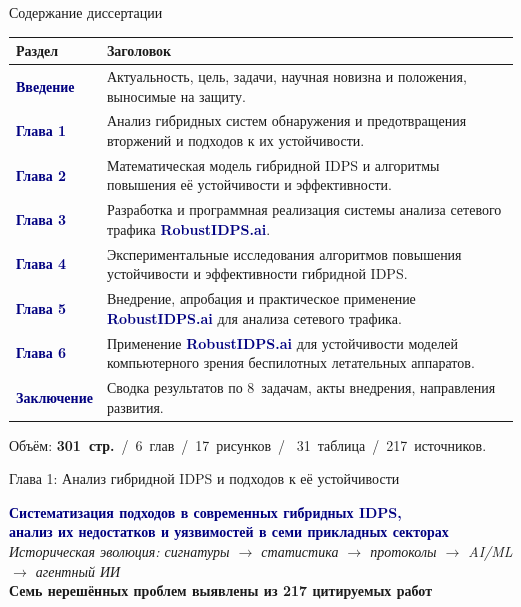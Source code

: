 \documentclass[10pt,aspectratio=169]{beamer}
\newcommand{\hl}[1]{\textcolor{accent}{\textbf{#1}}}
\newcommand{\bn}[1]{\textcolor{navy}{\textbf{#1}}}
\begin{document}
\begin{frame}{Содержание диссертации}
\scriptsize
\begin{tabular}{@{}p{1.8cm}p{12.4cm}@{}}
\toprule
\textbf{Раздел} & \textbf{Заголовок} \\
\midrule
\bn{Введение} & Актуальность, цель, задачи, научная новизна и
положения, выносимые на защиту. \\
\midrule
\bn{Глава 1} & Анализ гибридных систем обнаружения и
предотвращения вторжений и подходов к их устойчивости. \\
\midrule
\bn{Глава 2} & Математическая модель гибридной IDPS и алгоритмы
повышения её устойчивости и эффективности. \\
\midrule
\bn{Глава 3} & Разработка и программная реализация системы
анализа сетевого трафика \bn{RobustIDPS.ai}. \\
\midrule
\bn{Глава 4} & Экспериментальные исследования алгоритмов
повышения устойчивости и эффективности гибридной IDPS. \\
\midrule
\bn{Глава 5} & Внедрение, апробация и практическое применение
\bn{RobustIDPS.ai} для анализа сетевого трафика. \\
\midrule
\bn{Глава 6} & Применение \bn{RobustIDPS.ai} для устойчивости
моделей компьютерного зрения беспилотных летательных
аппаратов. \\
\midrule
\bn{Заключение} & Сводка результатов по 8~задачам, акты
внедрения, направления развития. \\
\bottomrule
\end{tabular}
\smallskip
\begin{block}{}
\scriptsize Объём: \hl{301~стр.}~/~6~глав~/~17~рисунков~/~
31~таблица~/~217~источников.
\end{block}
\end{frame}

\begin{frame}{Глава 1: Анализ гибридной IDPS и подходов к её устойчивости}
\vspace{1.5cm}
\begin{center}
{\Large\bn{Систематизация подходов в современных
гибридных IDPS,\\
анализ их недостатков и уязвимостей в семи прикладных
секторах}}\\[1cm]

\textit{Историческая эволюция: сигнатуры $\to$ статистика
$\to$ протоколы $\to$ AI/ML $\to$ агентный ИИ}\\[0.5cm]

\textcolor{accent}{\textbf{Семь нерешённых проблем выявлены из
217 цитируемых работ}}
\end{center}
\end{frame}
\end{document}
